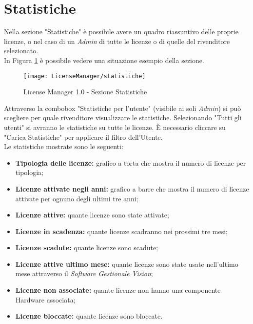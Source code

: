 \section{Statistiche}

Nella sezione "Statistiche" è possibile avere un quadro riassuntivo delle proprie licenze, o nel caso di un \textit{Admin} di tutte le licenze o di quelle del rivenditore selezionato.\\
In Figura \ref{stat} è possibile vedere una situazione esempio della sezione.


\begin{figure}[!h] 
    \centering 
    \texttt{[image: LicenseManager/statistiche]} 
    \caption{License Manager 1.0 - Sezione Statistiche}
\label{stat}

\end{figure}

Attraverso la combobox "Statistiche per l’utente" (visibile ai soli \textit{Admin}) si può scegliere per quale rivenditore visualizzare le statistiche. Selezionando "Tutti gli utenti" si avranno le statistiche su tutte le licenze. È necessario cliccare su "Carica Statistiche" per applicare il filtro dell’Utente.\\
Le statistiche mostrate sono le seguenti:

\begin{itemize}

\item \textbf{Tipologia delle licenze:} grafico a torta che mostra il numero di licenze per tipologia;
\item \textbf{Licenze attivate negli anni:} grafico a barre che mostra il numero di licenze attivate per ognuno degli ultimi tre anni;
\item \textbf{Licenze attive:} quante licenze sono state attivate;
\item \textbf{Licenze in scadenza:} quante licenze scadranno nei prossimi tre mesi;
\item \textbf{Licenze scadute:} quante licenze sono scadute;
\item \textbf{Licenze attive ultimo mese:} quante licenze sono state usate nell’ultimo mese attraverso il \textit{Software Gestionale Vision};
\item \textbf{Licenze non associate:} quante licenze non hanno una componente Hardware associata;
\item \textbf{Licenze bloccate:} quante licenze sono bloccate.

\end{itemize}

